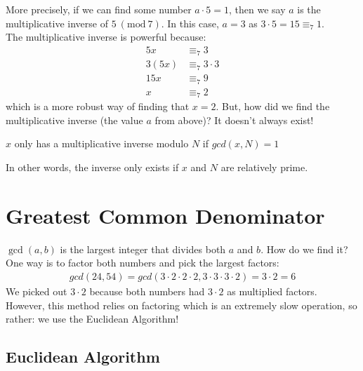 \documentclass[14pt]{extarticle}
\newcommand{\Mod}[1]{\ (\mathrm{mod}\ #1)}
\begin{document}
    More precisely, if we can find some number $a\cdot 5 = 1$, then
    we say $a$ is the multiplicative inverse of $5\Mod{7}$. In this case,
    $a = 3$ as $3\cdot 5 = 15 \equiv_7 1$.\\

    The multiplicative inverse is powerful because:
    \begin{align*}
        5x &\equiv_7 3              \\
        3(5x)   &\equiv_7 3\cdot 3    \\
        15x     &\equiv_7 9           \\
        x       &\equiv_7 2     
    \end{align*}
    which is a more robust way of finding that $x = 2$. But, how did we 
    find the multiplicative inverse (the value $a$ from above)? It doesn't
    always exist!

    \begin{theorem*}
        $x$ only has a multiplicative inverse modulo $N$ if $gcd(x, N) = 1$
    \end{theorem*}
    In other words, the inverse only exists if $x$ and $N$ are relatively
    prime.

    \section{Greatest Common Denominator}
    $\gcd(a, b)$ is the largest integer that divides both $a$ and $b$. How do
    we find it?\\

    One way is to factor both numbers and pick the largest factors:
    \begin{align*}
        gcd(24, 54) = gcd(3\cdot 2\cdot 2\cdot 2, 3\cdot 3\cdot 3\cdot 2)
        = 3 \cdot 2 = 6
    \end{align*}
    We picked out $3\cdot 2$ because both numbers had $3\cdot 2$ as multiplied
    factors. However, this method relies on factoring which is an extremely
    slow operation, so rather: we use the Euclidean Algorithm!

    \subsection{Euclidean Algorithm}
    \begin{algorithm}[H]
        \Fn{\FMain{$x, y$}}{
            \If{$y = 0$}{
                \Return $x$
            }
            \Return \Call{\FMain{$y, x\Mod{y}$}}
        }
    \end{algorithm}
\end{document}
